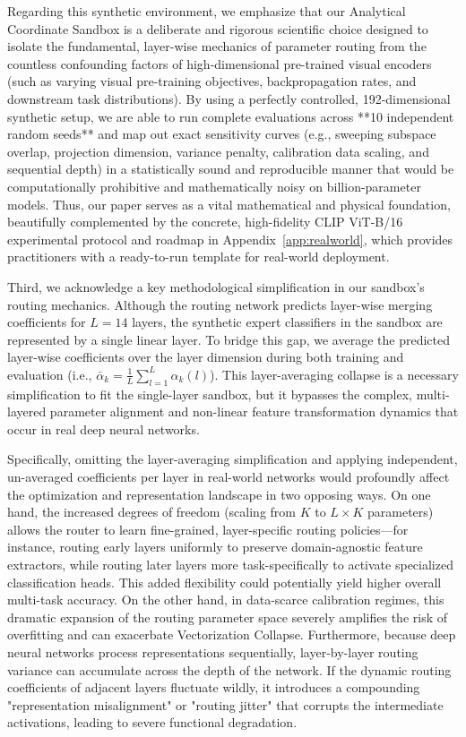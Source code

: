 Regarding this synthetic environment, we emphasize that our Analytical Coordinate Sandbox is a deliberate and rigorous scientific choice designed to isolate the fundamental, layer-wise mechanics of parameter routing from the countless confounding factors of high-dimensional pre-trained visual encoders (such as varying visual pre-training objectives, backpropagation rates, and downstream task distributions). By using a perfectly controlled, 192-dimensional synthetic setup, we are able to run complete evaluations across **10 independent random seeds** and map out exact sensitivity curves (e.g., sweeping subspace overlap, projection dimension, variance penalty, calibration data scaling, and sequential depth) in a statistically sound and reproducible manner that would be computationally prohibitive and mathematically noisy on billion-parameter models. Thus, our paper serves as a vital mathematical and physical foundation, beautifully complemented by the concrete, high-fidelity CLIP ViT-B/16 experimental protocol and roadmap in Appendix~\ref{app:realworld}, which provides practitioners with a ready-to-run template for real-world deployment.

Third, we acknowledge a key methodological simplification in our sandbox's routing mechanics. Although the routing network predicts layer-wise merging coefficients for $L=14$ layers, the synthetic expert classifiers in the sandbox are represented by a single linear layer. To bridge this gap, we average the predicted layer-wise coefficients over the layer dimension during both training and evaluation (i.e., $\bar{\alpha}_k = \frac{1}{L} \sum_{l=1}^L \alpha_k(l)$). This layer-averaging collapse is a necessary simplification to fit the single-layer sandbox, but it bypasses the complex, multi-layered parameter alignment and non-linear feature transformation dynamics that occur in real deep neural networks.

Specifically, omitting the layer-averaging simplification and applying independent, un-averaged coefficients per layer in real-world networks would profoundly affect the optimization and representation landscape in two opposing ways. On one hand, the increased degrees of freedom (scaling from $K$ to $L \times K$ parameters) allows the router to learn fine-grained, layer-specific routing policies---for instance, routing early layers uniformly to preserve domain-agnostic feature extractors, while routing later layers more task-specifically to activate specialized classification heads. This added flexibility could potentially yield higher overall multi-task accuracy. On the other hand, in data-scarce calibration regimes, this dramatic expansion of the routing parameter space severely amplifies the risk of overfitting and can exacerbate Vectorization Collapse. Furthermore, because deep neural networks process representations sequentially, layer-by-layer routing variance can accumulate across the depth of the network. If the dynamic routing coefficients of adjacent layers fluctuate wildly, it introduces a compounding "representation misalignment" or "routing jitter" that corrupts the intermediate activations, leading to severe functional degradation.

